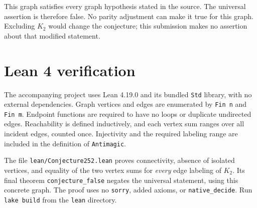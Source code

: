 \documentclass[11pt]{article}
\begin{document}
This graph satisfies every graph hypothesis stated in the source.
The universal assertion is therefore false. No parity adjustment can
make it true for this graph. Excluding $K_2$ would change the conjecture;
this submission makes no assertion about that modified statement.

\section{Lean 4 verification}
The accompanying project uses Lean 4.19.0 and its bundled \texttt{Std}
library, with no external dependencies. Graph vertices and edges are
enumerated by \texttt{Fin n} and \texttt{Fin m}. Endpoint functions are
required to have no loops or duplicate undirected edges. Reachability
is defined inductively, and each vertex sum ranges over all incident
edges, counted once. Injectivity and the required labeling range are
included in the definition of \texttt{Antimagic}.

The file \texttt{lean/Conjecture252.lean} proves connectivity, absence of
isolated vertices, and equality of the two vertex sums for \emph{every}
edge labeling of $K_2$. Its final theorem \texttt{conjecture\_false}
negates the universal statement, using this concrete graph.
The proof uses no \texttt{sorry}, added axioms, or \texttt{native\_decide}.
Run \texttt{lake build} from the \texttt{lean} directory.
\end{document}
